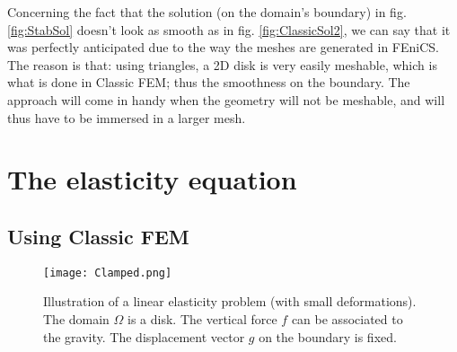 Concerning the fact that the solution (on the domain's boundary) in fig. \ref{fig:StabSol} doesn't look as smooth as in fig. \ref{fig:ClassicSol2}, we can say that it was perfectly anticipated due to the way the meshes are generated in FEniCS. The reason is that: using triangles, a 2D disk is very easily meshable, which is what is done in Classic FEM; thus the smoothness on the boundary. The \phifem  approach will come in handy when the geometry will not be meshable, and will thus have to be immersed in a larger mesh.

\section{The elasticity equation}


\subsection{Using Classic FEM}

\begin{figure}[H]
    \centering
    \texttt{[image: Clamped.png]}
    \caption{Illustration of a linear elasticity problem (with small deformations). The domain $ \Omega$ is a disk. The vertical force $f$ can be associated to the gravity. The displacement vector $g$ on the boundary is fixed.}
    \label{fig:beam}
\end{figure}


